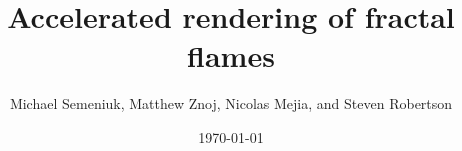 \title{Accelerated rendering of fractal flames}
\author{Michael Semeniuk, Matthew Znoj, Nicolas Mejia, and Steven Robertson}
\date{\today}

\maketitle

